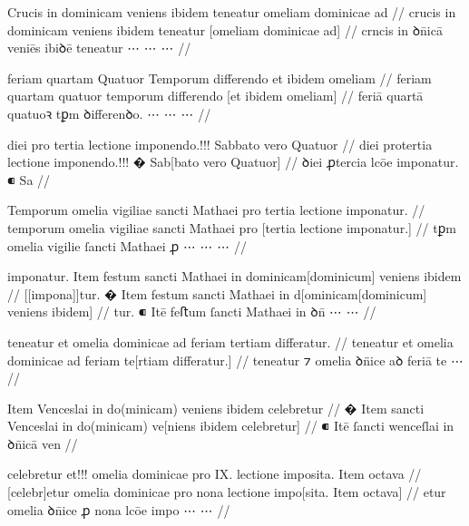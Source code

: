 \ex \bg
\gla
{}
Crucis in dominicam veniens ibidem
teneatur omeliam dominicae ad 
//
\glRekonstrukcja
{}
crucis in dominicam veniens ibidem
teneatur [omeliam dominicae ad]
//
\glU
{}
crncis in ꝺn̄icā veniēs ibiꝺē teneatur ⋯ ⋯ ⋯ 
//
\endgl
\xe



\ex \bg
\gla
{}
feriam quartam Quatuor Temporum
differendo et ibidem omeliam 
//
\glRekonstrukcja
{}
feriam quartam quatuor temporum
differendo [et ibidem omeliam] 
//
\glU
{}
feriā quartā quatuoꝛ tꝑm ꝺiﬀerenꝺo. ⋯ ⋯ ⋯
//
\endgl
\xe



\ex \bg
\gla
{}
diei pro tertia lectione imponendo.!!! {}
{} Sabbato vero Quatuor 
//
\glRekonstrukcja
{}
diei protertia lectione {} imponendo.!!!
� Sab[bato vero Quatuor]
//
\glU
{}
ꝺiei ꝓtercia lcōe {} imponatur. ⁌ Sa
//
\endgl
\xe



\ex \bg
\gla
Temporum omelia vigiliae sancti Mathaei
pro tertia lectione imponatur.
//
\glRekonstrukcja
temporum omelia vigiliae sancti Mathaei
pro [tertia lectione imponatur.]
//
\glU
{}
tꝑm omelia vigilie ſancti Mathaei ꝓ ⋯ ⋯ ⋯
//
\endgl
\xe



\ex \bg
\gla
{}
imponatur.
{} Item festum sancti Mathaei in dominicam[dominicum] veniens ibidem
//
\glRekonstrukcja
{}
[[impona]]tur.
� Item festum sancti Mathaei in d[ominicam[dominicum] veniens ibidem]
//
\glU
{}
tur. ⁌ Itē feﬅum ſancti Mathaei in ꝺn̄ ⋯ ⋯
//
\endgl
\xe



\ex \bg
\gla
{}
teneatur et omelia dominicae ad feriam tertiam differatur.
//
\glRekonstrukcja
{}
teneatur et omelia dominicae ad feriam te[rtiam differatur.]
//
\glU
{}
teneatur ⁊ omelia ꝺn̈ice aꝺ feriā te ⋯
//
\endgl
\xe



\ex \bg
\gla
{}
{} Item {} Venceslai in do(minicam) veniens ibidem celebretur
//
\glRekonstrukcja
{}
� Item sancti Venceslai in do(minicam) ve[niens ibidem celebretur]
//
\glU
{}
⁌ Itē ſancti wenceſlai in ꝺn̄icā ven
//
\endgl
\xe



\ex \bg
\gla
{}
celebretur et!!! omelia
dominicae pro IX. {} lectione imposita. Item octava
//
\glRekonstrukcja
{}
[celebr]etur {} omelia
dominicae pro {} nona lectione impo[sita. Item octava]
//
\glU
{}
etur {} omelia ꝺn̄ice ꝓ {} nona lcōe impo ⋯ ⋯
//
\endgl
\xe



